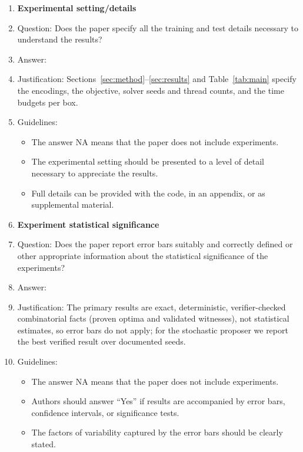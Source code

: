 \documentclass{article}
\begin{document}
\begin{enumerate}
\item {\bf Experimental setting/details}
    \item[] Question: Does the paper specify all the training and test details necessary to understand the results?
    \item[] Answer: \answerYes{}
    \item[] Justification: Sections~\ref{sec:method}--\ref{sec:results} and Table~\ref{tab:main} specify the encodings, the objective, solver seeds and thread counts, and the time budgets per box.
    \item[] Guidelines:
    \begin{itemize}
        \item The answer NA means that the paper does not include experiments.
        \item The experimental setting should be presented to a level of detail necessary to appreciate the results.
        \item Full details can be provided with the code, in an appendix, or as supplemental material.
    \end{itemize}

\item {\bf Experiment statistical significance}
    \item[] Question: Does the paper report error bars suitably and correctly defined or other appropriate information about the statistical significance of the experiments?
    \item[] Answer: \answerNA{}
    \item[] Justification: The primary results are exact, deterministic, verifier-checked combinatorial facts (proven optima and validated witnesses), not statistical estimates, so error bars do not apply; for the stochastic proposer we report the best verified result over documented seeds.
    \item[] Guidelines:
    \begin{itemize}
        \item The answer NA means that the paper does not include experiments.
        \item Authors should answer ``Yes'' if results are accompanied by error bars, confidence intervals, or significance tests.
        \item The factors of variability captured by the error bars should be clearly stated.
    \end{itemize}


\end{enumerate}
\end{document}
